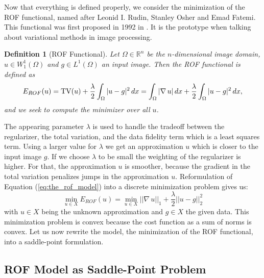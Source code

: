 \documentclass[abstracton]{scrreprt}
\newtheorem{definition}[theorem]{Definition}
\begin{document}
        Now that everything is defined properly, we consider the minimization of the ROF functional, named after Leonid I. Rudin, Stanley Osher and Emad Fatemi. This functional was first proposed in 1992 in \cite{ROF}. It is the prototype when talking about variational methods in image processing.
        \begin{definition}[ROF Functional] %
        \label{def:the_rof_functional}
            Let $\Omega \in \mathbb{R}^{n}$ be the $n$-dimensional image domain, $u \in W_{1}^{1}(\Omega)$ and $g \in L^{1}(\Omega)$ an input image. Then the ROF functional is defined as
                \begin{equation}
                    E_{ROF}(u) = \textnormal{TV}(u) + \frac{\lambda}{2} \int_{\Omega} |u - g|^{2} \, dx = \int_{\Omega} |\nabla \, u| \, dx + \frac{\lambda}{2} \int_{\Omega} |u - g|^{2} \, dx,
                    \label{eq:the_rof_model}
                \end{equation}
            and we seek to compute the minimizer over all $u$.
        \end{definition}
        The appearing parameter $\lambda$ is used to handle the tradeoff between the regularizer, the total variation, and the data fidelity term which is a least squares term. Using a larger value for $\lambda$ we get an approximation $u$ which is closer to the input image $g$. If we choose $\lambda$ to be small the weighting of the regularizer is higher. For that, the approximation $u$ is smoother, because the gradient in the total variation penalizes jumps in the approximation $u$. Reformulation of Equation (\ref{eq:the_rof_model}) into a discrete minimization problem gives us:
            \begin{equation}
                \min_{u \in X} E_{ROF}(u) = \min_{u \in X} ||\nabla \, u||_{1} + \frac{\lambda}{2} ||u - g||_{2}^{2}
            \label{eq:discrete_rof_model}
            \end{equation}
        with $u \in X$ being the unknown approximation and $g \in X$ the given data. This minimization problem is convex because the cost function as a sum of norms is convex. Let us now rewrite the model, the minimization of the ROF functional, into a saddle-point formulation.

        \subsection{ROF Model as Saddle-Point Problem} %
        \label{sub:rof_model_as_saddle_point_problem}
\end{document}
